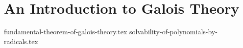 \chapter{An Introduction to Galois Theory}
{fundamental-theorem-of-galois-theory.tex}
{solvability-of-polynomials-by-radicals.tex}
